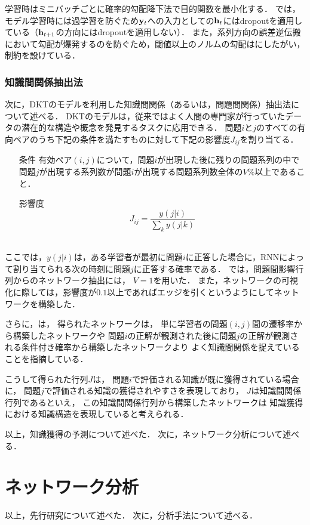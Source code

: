 学習時はミニバッチごとに確率的勾配降下法で目的関数を最小化する．
\cite{piech2015deep}では，モデル学習時には過学習を防ぐため${\bf y}_t$への入力としての${\bf h}_t$にはdropout\cite{srivastava2014dropout}を適用している（${\bf h}_{t+1}$の方向にはdropoutを適用しない）．
また，系列方向の誤差逆伝搬\cite{werbos1990backpropagation}において勾配が爆発するのを防ぐため，閾値以上のノルムの勾配は\cite{pascanu2013difficulty}にしたがい，制約を設けている．


\subsubsection{知識間関係抽出法}
次に，DKTのモデルを利用した知識間関係（あるいは，問題間関係）抽出法について述べる．
DKTのモデルは，従来ではよく人間の専門家が行っていたデータの潜在的な構造や概念を発見するタスクに応用できる．
問題$i$と$j$のすべての有向ペアのうち下記の条件を満たすものに対して下記の影響度$J_{ij}$を割り当てる．\\
\begin{itemize}
	\item [条件]有効ペア$(i, j)$について，問題$i$が出現した後に残りの問題系列の中で問題$j$が出現する系列数が問題$i$が出現する問題系列数全体の$V\%$以上であること．
	\item[影響度]
$$J_{ij} = \frac{y(j|i)}{\sum_k y(j|k)}$$\\
\end{itemize}
ここでは，$y(j|i)$は，ある学習者が最初に問題$i$に正答した場合に，RNNによって割り当てられる次の時刻に問題$j$に正答する確率である．
\cite{piech2015deep}では，問題間影響行列からのネットワーク抽出には，
$V=1$を用いた．
また，ネットワークの可視化に際しては，影響度が$0.1$以上であればエッジを引くというようにしてネットワークを構築した．

さらに，\cite{piech2015deep}は，
得られたネットワークは，
単に学習者の問題$(i, j)$間の遷移率から構築したネットワークや
問題$i$の正解が観測された後に問題$j$の正解が観測される条件付き確率から構築したネットワークより
よく知識間関係を捉えていることを指摘している．


こうして得られた行列$J$は，
問題$i$で評価される知識が既に獲得されている場合に，
問題$j$で評価される知識の獲得されやすさを表現しており，
$J$は知識間関係行列であるといえ，
この知識間関係行列から構築したネットワークは
知識獲得における知識構造を表現していると考えられる．


\vvspace
以上，知識獲得の予測について述べた．
次に，ネットワーク分析について述べる．

\section{ネットワーク分析}




\vvspace
以上，先行研究について述べた．
次に，分析手法について述べる．




